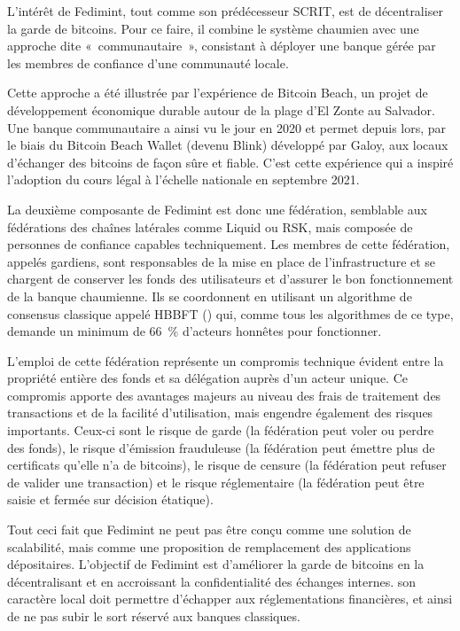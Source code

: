 
L'intérêt de Fedimint, tout comme son prédécesseur SCRIT, est de décentraliser la garde de bitcoins. Pour ce faire, il combine le système chaumien avec une approche dite «~communautaire~», consistant à déployer une banque gérée par les membres de confiance d'une communauté locale.

Cette approche a été illustrée par l'expérience de Bitcoin Beach, un projet de développement économique durable autour de la plage d'El Zonte au Salvador. Une banque communautaire a ainsi vu le jour en 2020 et permet depuis lors, par le biais du Bitcoin Beach Wallet (devenu Blink) développé par Galoy, aux locaux d'échanger des bitcoins de façon sûre et fiable. C'est cette expérience qui a inspiré l'adoption du cours légal à l'échelle nationale en septembre 2021.

La deuxième composante de Fedimint est donc une fédération, semblable aux fédérations des chaînes latérales comme Liquid ou RSK, mais composée de personnes de confiance capables techniquement. Les membres de cette fédération, appelés gardiens, sont responsables de la mise en place de l'infrastructure et se chargent de conserver les fonds des utilisateurs et d'assurer le bon fonctionnement de la banque chaumienne. Ils se coordonnent en utilisant un algorithme de consensus classique appelé HBBFT () qui, comme tous les algorithmes de ce type, demande un minimum de 66~\% d'acteurs honnêtes pour fonctionner. %

L'emploi de cette fédération représente un compromis technique évident entre la propriété entière des fonds et sa délégation auprès d'un acteur unique. Ce compromis apporte des avantages majeurs au niveau des frais de traitement des transactions et de la facilité d'utilisation, mais engendre également des risques importants. Ceux-ci sont le risque de garde (la fédération peut voler ou perdre des fonds), le risque d'émission frauduleuse (la fédération peut émettre plus de certificats qu'elle n'a de bitcoins), le risque de censure (la fédération peut refuser de valider une transaction) et le risque réglementaire (la fédération peut être saisie et fermée sur décision étatique).

Tout ceci fait que Fedimint ne peut pas être conçu comme une solution de scalabilité, mais comme une proposition de remplacement des applications dépositaires. L'objectif de Fedimint est d'améliorer la garde de bitcoins en la décentralisant et en accroissant la confidentialité des échanges internes. son caractère local doit permettre d'échapper aux réglementations financières, et ainsi de ne pas subir le sort réservé aux banques classiques.

